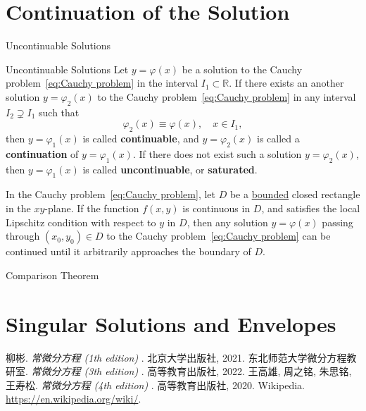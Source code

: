 \documentclass[11pt]{../../TexTemplate/elegantbook}
\begin{document}
\section{Continuation of the Solution}
\begin{leftbarTitle}{Uncontinuable Solutions}\end{leftbarTitle}
\begin{definition}{Uncontinuable Solutions}
    Let \(y = \varphi(x)\) be a solution to the Cauchy problem~\eqref{eq:Cauchy problem} in the interval \(I_1\subset \mathbb{R}\).
    If there exists an another solution \(y = \varphi_{2}(x)\) to the Cauchy problem~\eqref{eq:Cauchy problem} 
    in any interval \(I_{2} \supsetneq I_{1}\) such that
    \[
    \varphi_{2}(x) \equiv \varphi(x), \quad x \in I_{1},
    \]
    then \(y = \varphi_{1}(x)\) is called \textbf{continuable},
    and \(y = \varphi_{2}(x)\) is called a \textbf{continuation} of \(y = \varphi_{1}(x)\).
    If there does not exist such a solution \(y = \varphi_{2}(x)\), 
    then \(y = \varphi_{1}(x)\) is called \textbf{uncontinuable}, or \textbf{saturated}.
\end{definition}

\begin{theorem}
    In the Cauchy problem~\eqref{eq:Cauchy problem},
    let \(D\) be a \underline{bounded} closed rectangle in the \(xy\)-plane.
    If the function \(f(x, y)\) is continuous in \(D\),
    and satisfies the local Lipschitz condition with respect to \(y\) in \(D\),
    then any solution \(y = \varphi(x)\) passing through \((x_{0}, y_{0}) \in D\) 
    to the Cauchy problem~\eqref{eq:Cauchy problem} can be continued
    until it arbitrarily approaches the boundary of \(D\).
\end{theorem}

\begin{leftbarTitle}{Comparison Theorem}\end{leftbarTitle}

\section{Singular Solutions and Envelopes}



\begin{thebibliography}{99} 
 柳彬. \emph{常微分方程 (1th edition) }. 北京大学出版社, 2021.
 东北师范大学微分方程教研室. \emph{常微分方程 (3th edition) }. 高等教育出版社, 2022.
 王高雄, 周之铭, 朱思铭, 王寿松. \emph{常微分方程 (4th edition) }. 高等教育出版社, 2020.
 Wikipedia. \url{https://en.wikipedia.org/wiki/}.

\end{thebibliography}
\end{document}
